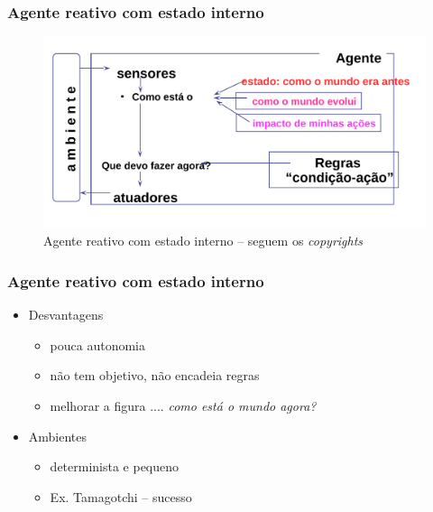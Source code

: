 \begin{frame} %

 \frametitle{Agente reativo com estado interno}

\begin{figure}[!ht]
  \centering
  \includegraphics[height =.6\textheight,width=.7\textwidth]
  {figuras/agente_reativo_com_estado_interno.pdf}
  \caption{Agente reativo com estado interno -- seguem os \textit{copyrights}}
\end{figure}

\end{frame}




\begin{frame} %

    \frametitle{Agente reativo com estado interno}

\begin{itemize}
  \item Desvantagens
  \begin{itemize}
    \item pouca autonomia

   \item não tem objetivo, não encadeia regras
   
   \item melhorar a figura .... \textit{como está o mundo agora?}
  \end{itemize}
  
  \item Ambientes
\begin{itemize}
  \item determinista e pequeno 
  \item Ex. Tamagotchi -- sucesso 
\end{itemize}
  
\end{itemize}
\end{frame}


